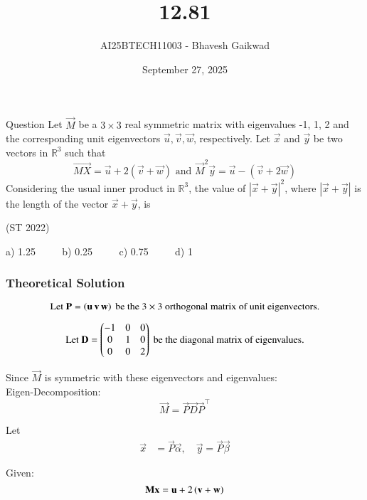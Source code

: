 \documentclass{beamer}
\title
{12.81}
\date{September 27, 2025}
\author 
{AI25BTECH11003 - Bhavesh Gaikwad}
\begin{document}
\frame{\titlepage}
\begin{frame}{Question}
Let $\vec{M}$ be a $3\times3$ real symmetric matrix with eigenvalues -1, 1, 2 and the corresponding unit eigenvectors $\vec{u}, \vec{v},\vec{w}$, respectively. Let $\vec{x}$ and $\vec{y}$ be two vectors in $\mathbb{R}^3$ such that
$$\vec{MX} = \vec{u} + 2(\vec{v} + \vec{w}) \text{ and } \vec{M}^2\vec{y} = \vec{u} - (\vec{v} + 2\vec{w})$$
Considering the usual inner product in $\mathbb{R}^3$, the value of $|\vec{x} + \vec{y}|^2$, where $|\vec{x} + \vec{y}|$ is the
length of the vector $\vec{x} + \vec{y}$, is

\hfill{(ST 2022)}

a) 1.25 $\qquad$ b) 0.25 $\qquad$ c) 0.75 $\qquad$ d) 1
\end{frame}


\begin{frame}[fragile]
    \frametitle{Theoretical Solution}
\begin{equation}
\text{Let }\mathbf{P} = \left(\mathbf{u} \, \mathbf{v} \, \mathbf{w}\right) \text{ be the $3 \times 3$ orthogonal matrix of unit eigenvectors.}
\end{equation}



\begin{equation}
\text{Let } \mathbf{D} = \begin{pmatrix}-1 & 0 & 0 \\ 0 & 1 & 0 \\ 0 & 0 & 2\end{pmatrix} \text{ be the diagonal matrix of eigenvalues.}
\end{equation}


Since $\vec{M}$ is symmetric with these eigenvectors and eigenvalues:\\
Eigen-Decomposition:
\begin{equation}
\vec{M} = \vec{P}\vec{D}\vec{P}^\top
\end{equation}


Let
\begin{align}
\vec{x} &= \vec{P}\vec{\alpha}, \quad \vec{y} = \vec{P}\vec{\beta}
\end{align}

Given:
\begin{equation}
\mathbf{M}\mathbf{x} = \mathbf{u} + 2\left(\mathbf{v} + \mathbf{w}\right)
\end{equation}
\end{frame}
\end{document}

